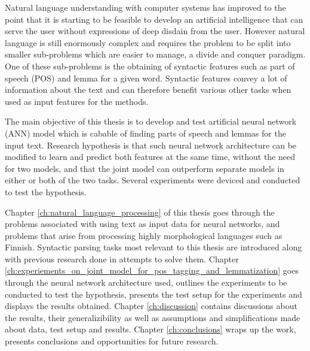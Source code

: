 \documentclass[12pt,a4paper,english
]{tutthesis}
\begin{document}
Natural language understanding with computer systems has improved to the point that it is starting to be feasible to develop an artificial intelligence that can serve the user without expressions of deep disdain from the user. However natural language is still enormously complex and requires the problem to be split into smaller sub-problems which are easier to manage, a divide and conquer paradigm. One of these sub-problems is the obtaining of syntactic features such as part of speech (POS) and lemma for a given word. Syntactic features convey a lot of information about the text and can therefore benefit various other tasks when used as input features for the methods.

The main objective of this thesis is to develop and test artificial neural network (ANN) model which is cabable of finding parts of speech and lemmas for the input text. Research hypothesis is that such neural network architecture can be modified to learn and predict both features at the same time, without the need for two models, and that the joint model can outperform separate models in either or both of the two tasks. Several experiments were deviced and conducted to test the hypothesis.

Chapter \ref{ch:natural_language_processing} of this thesis goes through the problems associated with using text as input data for neural networks, and problems that arise from processing highly morphological languages such as Finnish. Syntactic parsing tasks most relevant to this thesis are introduced along with previous research done in attempts to solve them. Chapter \ref{ch:experiements_on_joint_model_for_pos_tagging_and_lemmatization} goes through the neural network architecture used, outlines the experiments to be conducted to test the hypothesis, presents the test setup for the experiments and displays the results obtained. Chapter \ref{ch:discussion} contains discussions about the results, their generalizibility as well as assumptions and simplifications made about data, test setup and results. Chapter \ref{ch:conclusions} wraps up the work, presents conclusions and opportunities for future research.
\end{document}
